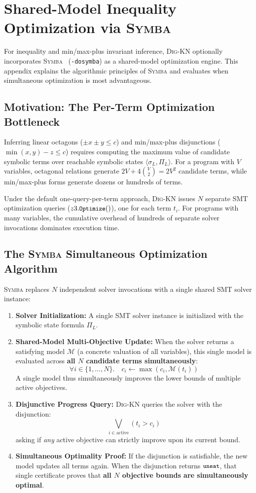 \documentclass[runningheads]{llncs}
\newcommand{\tool}{\textsc{Dig-KN}\xspace}
\newcommand{\code}[1]{\texttt{\small #1}}
\begin{document}
\section{Shared-Model Inequality Optimization via \textsc{Symba}}
\label{sec:appendix_symba}

For inequality and min/max-plus invariant inference, \tool{} optionally incorporates \textsc{Symba}~\cite{li2014symba} (\code{-dosymba}) as a shared-model optimization engine. This appendix explains the algorithmic principles of \textsc{Symba} and evaluates when simultaneous optimization is most advantageous.

\subsection{Motivation: The Per-Term Optimization Bottleneck}
Inferring linear octagons ($\pm x \pm y \le c$) and min/max-plus disjunctions ($\min(x,y) - z \le c$) requires computing the maximum value of candidate symbolic terms over reachable symbolic states $\langle\sigma_L, \Pi_L\rangle$.  For a program with $V$ variables, octagonal relations generate $2V + 4\binom{V}{2} = 2V^2$ candidate terms, while min/max-plus forms generate dozens or hundreds of terms.

Under the default one-query-per-term approach, \tool{} issues $N$ separate SMT optimization queries ($z3.\code{Optimize}()$), one for each term $t_i$. For programs with many variables, the cumulative overhead of hundreds of separate solver invocations dominates execution time.

\subsection{The \textsc{Symba} Simultaneous Optimization Algorithm}
\textsc{Symba} replaces $N$ independent solver invocations with a single shared SMT solver instance:
\begin{enumerate}[leftmargin=1.5em,itemsep=2pt]
\item \textbf{Solver Initialization:} A single SMT solver instance is initialized with the symbolic state formula $\Pi_L$.
\item \textbf{Shared-Model Multi-Objective Update:} When the solver returns a satisfying model $\mathcal{M}$ (a concrete valuation of all variables), this single model is evaluated across \textbf{all $N$ candidate terms simultaneously}:
$$\forall i \in \{1, \dots, N\}.\quad c_i \leftarrow \max(c_i, \mathcal{M}(t_i))$$
A single model thus simultaneously improves the lower bounds of multiple active objectives.
\item \textbf{Disjunctive Progress Query:} \tool{} queries the solver with the disjunction:
$$\bigvee_{i \in \text{active}} (t_i > c_i)$$
asking if \emph{any} active objective can strictly improve upon its current bound.
\item \textbf{Simultaneous Optimality Proof:} If the disjunction is satisfiable, the new model updates all terms again. When the disjunction returns $\code{unsat}$, that single certificate proves that \textbf{all $N$ objective bounds are simultaneously optimal}.
\end{enumerate}
\end{document}
